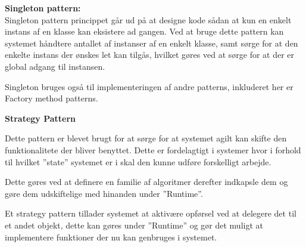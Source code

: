 \documentclass[Rapport/Rapport_main.tex]{subfiles}
\begin{document}
\textbf{Singleton pattern: } \\
Singleton pattern princippet går ud på at designe kode sådan at kun en enkelt instans af en klasse kan eksistere ad gangen.  Ved at bruge dette pattern kan systemet håndtere antallet af instanser af en enkelt klasse, samt sørge for at den enkelte instans der ønskes let kan tilgås, hvilket gøres ved at sørge for at der er global adgang til instansen. 

Singleton bruges også til implementeringen af andre patterns, inkluderet her er Factory method patterns. 

\textbf{Strategy Pattern}

Dette pattern er blevet brugt for at sørge for at systemet agilt kan skifte den funktionalitete der bliver benyttet. Dette er fordelagtigt i systemer hvor i forhold til hvilket ”state” systemet er i skal den kunne udføre forskelligt arbejde. 

Dette gøres ved at definere en familie af algoritmer derefter indkapsle dem og gøre dem udskiftelige med hinanden under ”Runtime”. 

Et strategy pattern tillader systemet at aktivære opførsel ved at delegere det til et andet objekt, dette kan gøres under ”Runtime” og gør det muligt at implementere funktioner der nu kan genbruges i systemet. 
\end{document}
